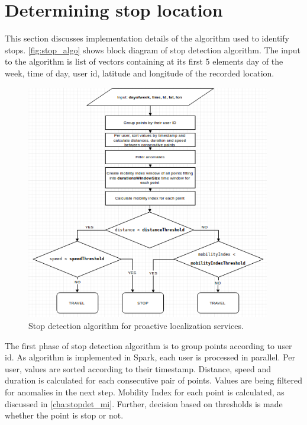 \section{Determining stop location}
\label{cha:stopdet_impl}

This section discusses implementation details of the algorithm used to identify stops. \autoref{fig:stop_algo} shows block diagram of stop detection algorithm. The input to the algorithm is list of vectors containing at its first 5 elements day of the week, time of day, user id, latitude and longitude of the recorded location. 

\begin{figure}[!ht]
	\centering
	\includegraphics[width=0.95\textwidth]{images/stop_algo.png}
	\caption{ Stop detection algorithm for proactive localization services. }
	\label{fig:stop_algo}
\end{figure} 

\FloatBarrier

The first phase of stop detection algorithm is to group points according to user id. As algorithm is implemented in Spark, each user is processed in parallel. Per user, values are sorted according to their timestamp. Distance, speed and duration is calculated for each consecutive pair of points. Values are being filtered for anomalies in the next step. Mobility Index for each point is calculated, as discussed in \autoref{cha:stopdet_mi}. Further, decision based on thresholds is made whether the point is stop or not. 


